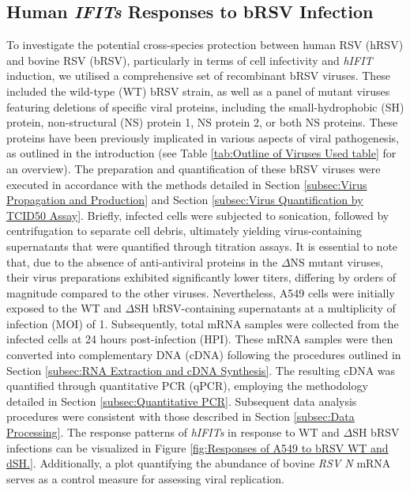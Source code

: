 \subsection{Human \textit{IFITs} Responses to bRSV Infection} \label{subsec:Human IFITs Responses to bRSV}
To investigate the potential cross-species protection between human RSV (hRSV) and bovine RSV (bRSV), particularly in terms of cell infectivity and \textit{hIFIT} induction, we utilised a comprehensive set of recombinant bRSV viruses. These included the wild-type (WT) bRSV strain, as well as a panel of mutant viruses featuring deletions of specific viral proteins, including the small-hydrophobic (SH) protein, non-structural (NS) protein 1, NS protein 2, or both NS proteins. These proteins have been previously implicated in various aspects of viral pathogenesis, as outlined in the introduction (see Table \ref{tab:Outline of Viruses Used table} for an overview). The preparation and quantification of these bRSV viruses were executed in accordance with the methods detailed in Section \ref{subsec:Virus Propagation and Production} and Section \ref{subsec:Virus Quantification by TCID50 Assay}. Briefly, infected cells were subjected to sonication, followed by centrifugation to separate cell debris, ultimately yielding virus-containing supernatants that were quantified through titration assays. It is essential to note that, due to the absence of anti-antiviral proteins in the \(\Delta\)NS mutant viruses, their virus preparations exhibited significantly lower titers, differing by orders of magnitude compared to the other viruses. Nevertheless, A549 cells were initially exposed to the WT and \(\Delta\)SH bRSV-containing supernatants at a multiplicity of infection (MOI) of 1. Subsequently, total mRNA samples were collected from the infected cells at 24 hours post-infection (HPI). These mRNA samples were then converted into complementary DNA (cDNA) following the procedures outlined in Section \ref{subsec:RNA Extraction and cDNA Synthesis}. The resulting cDNA was quantified through quantitative PCR (qPCR), employing the methodology detailed in Section \ref{subsec:Quantitative PCR}. Subsequent data analysis procedures were consistent with those described in Section \ref{subsec:Data Processing}. The response patterns of \textit{hIFITs} in response to WT and \(\Delta\)SH bRSV infections can be visualized in Figure \ref{fig:Responses of A549 to bRSV WT and dSH.}. Additionally, a plot quantifying the abundance of bovine \textit{RSV N} mRNA serves as a control measure for assessing viral replication.

